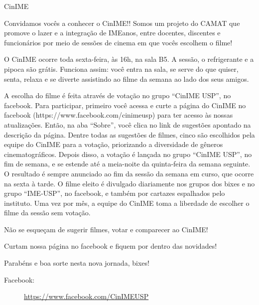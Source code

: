 \begin{subsecao}{CinIME}


Convidamos vocês a conhecer o CinIME!! Somos um projeto do CAMAT que promove o
lazer e a integração de IMEanos, entre docentes, discentes e funcionários por
meio de sessões de cinema em que vocês escolhem o filme!

O CinIME ocorre toda sexta-feira, às 16h, na sala B5. A sessão, o refrigerante
e a pipoca são grátis. Funciona assim: você entra na sala, se serve do que
quiser, senta, relaxa e se diverte assistindo ao filme da semana ao lado dos
seus amigos.

A escolha do filme é feita através de votação no grupo “CinIME USP”, no
facebook. Para participar, primeiro você acessa e curte a página do CinIME no
facebook (https://www.facebook.com/cinimeusp) para ter acesso às nossas
atualizações. Então, na aba “Sobre”, você clica no link de sugestões apontado
na descrição da página. Dentre todas as sugestões de filmes, cinco são
escolhidos pela equipe do CinIME para a votação, priorizando a diversidade de
gêneros cinematográficos. Depois disso, a votação é lançada no grupo “CinIME
USP”, no fim de semana, e se estende até a meia-noite da quinta-feira da semana
seguinte. O resultado é sempre anunciado ao fim da sessão da semana em curso,
que ocorre na sexta à tarde. O filme eleito é divulgado diariamente nos grupos
dos bixes e no grupo “IME-USP”, no facebook, e também por cartazes espalhados
pelo instituto. Uma vez por mês, a equipe do CinIME toma a liberdade de
escolher o filme da sessão sem votação.

Não se esqueçam de sugerir filmes, votar e comparecer ao CinIME!

Curtam nossa página no facebook e fiquem por dentro das novidades!

Parabéns e boa sorte nesta nova jornada, bixes!

\begin{description}
  \item[Facebook:] \url{https://www.facebook.com/CinIMEUSP}
\end{description}

\end{subsecao}
